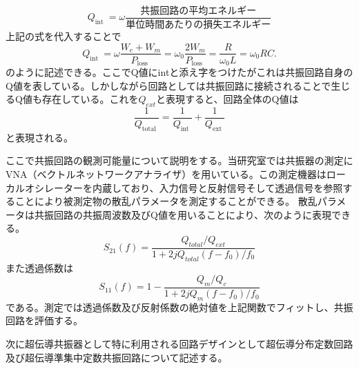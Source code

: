        \begin{equation}
            Q_{\text {int }}=\omega \frac{共振回路の平均エネルギー}{単位時間あたりの損失エネルギー}
        \end{equation}
        上記の式を代入することで
        \begin{equation}
            Q_{\text {int }}=\omega \frac{W_{e}+W_{m}}{P_{\text {loss }}}=\omega_{0} \frac{2 W_{m}}{P_{\text {loss }}}=\frac{R}{\omega_{0} L}=\omega_{0} R C .
        \end{equation}
        のように記述できる。ここでQ値にintと添え字をつけたがこれは共振回路自身のQ値を表している。しかしながら回路としては共振回路に接続されることで生じるQ値も存在している。これを$Q_{ext}$と表現すると、回路全体のQ値は
        \begin{equation}
            \frac{1}{Q_{\text {total }}}=\frac{1}{Q_{\text {int }}}+\frac{1}{Q_{\text {ext }}}
        \end{equation}
        と表現される。

        ここで共振回路の観測可能量について説明をする。当研究室では共振器の測定にVNA（ベクトルネットワークアナライザ）を用いている。この測定機器はローカルオシレーターを内蔵しており、入力信号と反射信号そして透過信号を参照することにより被測定物の散乱パラメータを測定することができる。
        散乱パラメータは共振回路の共振周波数及びQ値を用いることにより、次のように表現できる。
        \begin{equation}
            S_{21}(f)=\frac{Q_{total} / Q_{ext}}{1+2 j Q_{total}\left(f-f_{0}\right) / f_{0}}
        \end{equation}
        また透過係数は
        \begin{equation}
            S_{11}(f)=1-\frac{Q_{m} / Q_{c}}{1+2 j Q_{m}\left(f-f_{0}\right) / f_{0}}
        \end{equation}
        である。測定では透過係数及び反射係数の絶対値を上記関数でフィットし、共振回路を評価する。

        次に超伝導共振器として特に利用される回路デザインとして超伝導分布定数回路及び超伝導準集中定数共振回路について記述する。
